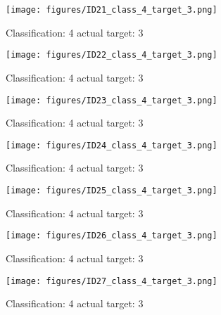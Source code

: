 \begin{figure}[h!]
\begin{center}
\texttt{[image: figures/ID21\_class\_4\_target\_3.png]}
\end{center}
\caption{ Classification: 4 actual target: 3}
\label{fig:ID21_class_4_target_3}
\end{figure}
\begin{figure}[h!]
\begin{center}
\texttt{[image: figures/ID22\_class\_4\_target\_3.png]}
\end{center}
\caption{ Classification: 4 actual target: 3}
\label{fig:ID22_class_4_target_3}
\end{figure}
\begin{figure}[h!]
\begin{center}
\texttt{[image: figures/ID23\_class\_4\_target\_3.png]}
\end{center}
\caption{ Classification: 4 actual target: 3}
\label{fig:ID23_class_4_target_3}
\end{figure}
\begin{figure}[h!]
\begin{center}
\texttt{[image: figures/ID24\_class\_4\_target\_3.png]}
\end{center}
\caption{ Classification: 4 actual target: 3}
\label{fig:ID24_class_4_target_3}
\end{figure}
\begin{figure}[h!]
\begin{center}
\texttt{[image: figures/ID25\_class\_4\_target\_3.png]}
\end{center}
\caption{ Classification: 4 actual target: 3}
\label{fig:ID25_class_4_target_3}
\end{figure}
\begin{figure}[h!]
\begin{center}
\texttt{[image: figures/ID26\_class\_4\_target\_3.png]}
\end{center}
\caption{ Classification: 4 actual target: 3}
\label{fig:ID26_class_4_target_3}
\end{figure}
\begin{figure}[h!]
\begin{center}
\texttt{[image: figures/ID27\_class\_4\_target\_3.png]}
\end{center}
\caption{ Classification: 4 actual target: 3}
\label{fig:ID27_class_4_target_3}
\end{figure}
